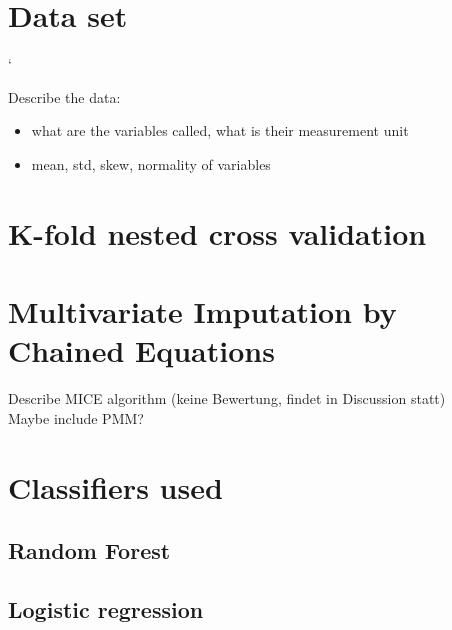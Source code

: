 \section{Data set}`
\begin{changemargin}{50pt}{50pt}
Describe the data:
\begin{itemize}
    \item what are the variables called, what is their measurement unit
    \item mean, std, skew, normality of variables
\end{itemize}
\end{changemargin}
\section{K-fold nested cross validation}
\section{Multivariate Imputation by Chained Equations}
\begin{changemargin}{50pt}{50pt}
Describe MICE algorithm (keine Bewertung, findet in Discussion statt)
\\
Maybe include PMM?
\end{changemargin}
\section{Classifiers used}
\subsection{Random Forest}
\subsection{Logistic regression}